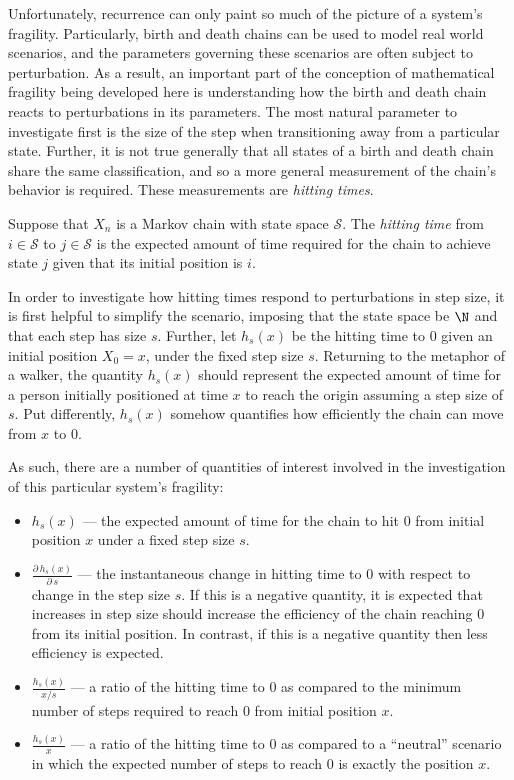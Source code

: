 \def\lf{\left\lfloor}
\def\rf{\right\rfloor}

\def\lc{\left\lceil}
\def\rc{\right\rceil}

Unfortunately, recurrence can only paint so much of the picture of a system's fragility. Particularly,
birth and death chains can be used to model real world scenarios, and the parameters governing these
scenarios are often subject to perturbation. As a result, an important part of the conception of
mathematical fragility being developed here is understanding how the birth and death chain reacts to
perturbations in its parameters. The most natural parameter to investigate first is the size of the step
when transitioning away from a particular state. Further, it is not true generally that all states of a
birth and death chain share the same classification, and so a more general measurement of the chain's
behavior is required. These measurements are \emph{hitting times}.
\begin{definition}
    Suppose that $X_n$ is a Markov chain with state space $\mathcal{S}$. The \emph{hitting time} from
    $i \in \mathcal{S}$ to $j \in \mathcal{S}$ is the expected amount of time required for the chain to
    achieve state $j$ given that its initial position is $i$.
\end{definition}

In order to investigate how hitting times respond to perturbations in step size, it is first helpful to
simplify the scenario, imposing that the state space be $\N$ and that each step has size $s$. Further,
let $h_s(x)$ be the hitting time to $0$ given an initial position $X_0 = x$, under the fixed step size
$s$. Returning to the metaphor of a walker, the quantity $h_s(x)$ should represent the expected amount
of time for a person initially positioned at time $x$ to reach the origin assuming a step size of $s$.
Put differently, $h_s(x)$ somehow quantifies how efficiently the chain can move from $x$ to $0$.

As such, there are a number of quantities of interest involved in the investigation of this particular
system's fragility:
\begin{itemize}
    \item   $h_s(x)$ --- the expected amount of time for the chain to hit $0$ from initial position $x$
        under a fixed step size $s$.
    \item   $\frac{\partial\, h_s(x)}{\partial\, s}$ --- the instantaneous change in hitting time to $0$
        with respect to change in the step size $s$. If this is a negative quantity, it is expected that
        increases in step size should increase the efficiency of the chain reaching $0$ from its initial
        position. In contrast, if this is a negative quantity then less efficiency is expected.
    \item   $\frac{h_s(x)}{x/s}$ --- a ratio of the hitting time to $0$ as compared to the minimum
        number of steps required to reach $0$ from initial position $x$.
    \item   $\frac{h_s(x)}{x}$ --- a ratio of the hitting time to $0$ as compared to a ``neutral''
        scenario in which the expected number of steps to reach $0$ is exactly the position $x$.
\end{itemize}

